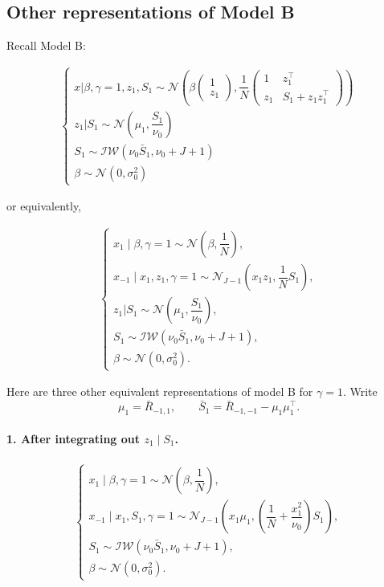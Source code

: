 \documentclass[11pt]{article}
\newcommand{\Normal}{\mathcal N}
\begin{document}
\subsection{Other representations of Model B}
Recall Model B:

\begin{align}\label{eq:SER-model-B-recall} 
\begin{cases}
x | \beta, \gamma = 1, z_1, S_1 \sim \mathcal{N}\left(\beta 
\begin{pmatrix}
1  \\
z_1
\end{pmatrix}, 
\dfrac{1}{N} \begin{pmatrix}
1 & z_1^\top \\
z_1 & S_1 + z_1 z_1^\top
\end{pmatrix}\right)\\
z_1 | S_1 \sim \mathcal{N}\left(\mu_1, \dfrac{S_1}{\nu_0}\right)\\
S_1 \sim \mathcal{IW}(\nu_0 \bar S_1, \nu_0 + J + 1)\\
\beta \sim \mathcal{N}(0, \sigma_0^2)
\end{cases}
\end{align}

or equivalently,

\begin{align}\label{eq:model-Bp}
\begin{cases}
x_1\mid \beta,\gamma=1
\sim
\Normal\left(\beta,\dfrac{1}{N}\right),\\
x_{-1}\mid x_1,z_1,\gamma=1
\sim
\Normal_{J-1}\left(
x_1 z_1,
\dfrac{1}{N}S_1
\right),\\
z_1 | S_1 \sim \mathcal{N}\left(\mu_1, \dfrac{S_1}{\nu_0}\right),\\
S_1\sim\mathcal{IW}(\nu_0\bar S_1,\nu_0+J+1),\\
\beta\sim\Normal(0,\sigma_0^2).
\end{cases}
\end{align}

Here are three other equivalent representations of model B for $\gamma=1$. Write
\[
\mu_1=\bar R_{-1,1},
\qquad
\bar S_1=\bar R_{-1,-1}-\mu_1\mu_1^\top.
\]
\paragraph{1. After integrating out $z_1\mid S_1$.}
\begin{align}\label{eq:model-B1}
\begin{cases}
x_1\mid \beta,\gamma=1
\sim
\Normal\left(\beta,\dfrac{1}{N}\right),\\
x_{-1}\mid x_1,S_1,\gamma=1
\sim
\Normal_{J-1}\left(
x_1\mu_1,
\left(\dfrac{1}{N}+\dfrac{x_1^2}{\nu_0}\right)S_1
\right),\\
S_1\sim\mathcal{IW}(\nu_0\bar S_1,\nu_0+J+1),\\
\beta\sim\Normal(0,\sigma_0^2).
\end{cases}
\end{align}
\end{document}
